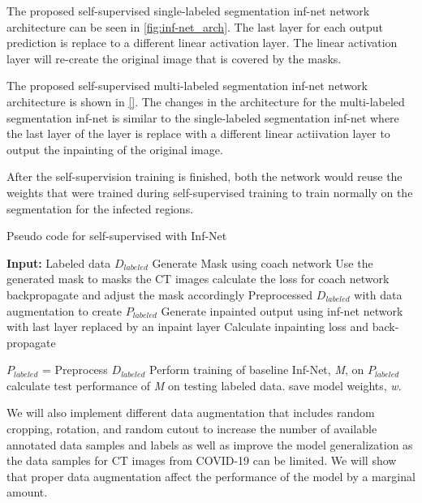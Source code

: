The proposed self-supervised single-labeled segmentation inf-net network architecture can be seen in \ref{fig:inf-net_arch}. The last layer for each output prediction is replace to a different linear activation layer. The linear activation layer will re-create the original image that is covered by the masks. 

The proposed self-supervised multi-labeled segmentation inf-net network architecture is shown in \ref{}. The changes in the architecture for the multi-labeled segmentation inf-net is similar to the single-labeled segmentation inf-net where the last layer of the layer is replace with a different linear actiivation layer to output the inpainting of the original image. 

After the self-supervision training is finished, both the network would reuse the weights that were trained during self-supervised training to train normally on the segmentation for the infected regions.

\begin{algorithm}
	\caption{Pseudo code for self-supervised with Inf-Net}
	\label{alg:self-inf-net}
	\begin{algorithmic}
		\STATE \textbf{Input:} Labeled data $D_{labeled}$
			\STATE Generate Mask using coach network
			\STATE Use the generated mask to masks the CT images
			\STATE calculate the loss for coach network
			\STATE backpropagate and adjust the mask accordingly
			\ENDFOR
			\STATE Preprocessed $D_{labeled}$ with data augmentation to create $P_{labeled}$
			\STATE Generate inpainted output using inf-net network with last layer replaced by an inpaint layer
			\STATE Calculate inpainting loss and back-propagate
			\ENDFOR
		\ENDFOR 
		

		\STATE $P_{labeled}$ = Preprocess $D_{labeled}$
		\STATE Perform training of baseline Inf-Net, \textit{M}, on $P_{labeled}$
		\STATE calculate test performance of \textit{M} on testing labeled data.
		\STATE save model weights, \textit{w}.
		\ENDFOR
	\end{algorithmic}
\end{algorithm}

We will also implement different data augmentation that includes random cropping, rotation, and random cutout \cite{ref7,ref15,ref16} to increase the number of available annotated data samples and labels as well as improve the model generalization as the data samples for CT images from COVID-19 can be limited. We will show that proper data augmentation affect the performance of the model by a marginal amount.


